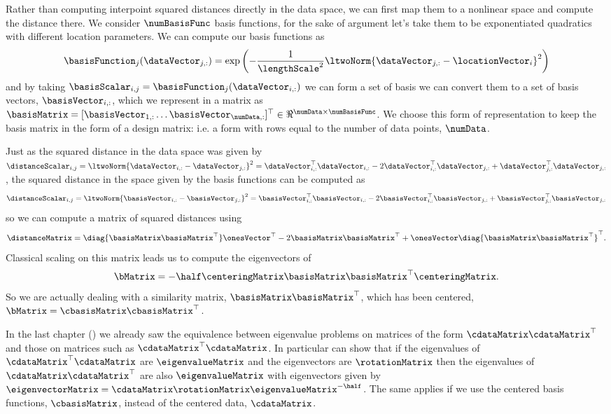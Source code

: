 Rather than computing interpoint squared distances directly in the
data space, we can first map them to a nonlinear space and compute the
distance there. We consider $\numBasisFunc$ basis functions, for the
sake of argument let's take them to be exponentiated quadratics with
different location parameters. We can compute our basis functions as
\[
\basisFunction_j(\dataVector_{j, :}) =
\exp\left(-\frac{1}{\lengthScale^2}\ltwoNorm{\dataVector_{j, :} -
    \locationVector_{i}}^2\right)
\]
and by taking $\basisScalar_{i,j}=\basisFunction_{j}(\dataVector_{i,
  :})$ we can form a set of basis we can convert them to a set of
basis vectors, $\basisVector_{i,:}$, which we represent in a matrix as
$\basisMatrix=[\basisVector_{1, :} \dots \basisVector_{\numData,
  :}]^\top\in\Re^{\numData\times \numBasisFunc}$. We choose this form
of representation to keep the basis matrix in the form of a design
matrix: i.e. a form with rows equal to the number of data points,
$\numData$.

Just as the squared distance in the data space was given by
$\distanceScalar_{i, j}=\ltwoNorm{\dataVector_{i, :} - \dataVector_{j,
    :}}^2 = \dataVector_{i, :}^\top\dataVector_{i, :} -
2\dataVector_{i, :}^\top\dataVector_{j, :} + \dataVector_{j, :}^\top
\dataVector_{j, :}$, the squared distance in the space given by the
basis functions can be computed as
\[
\distanceScalar_{i, j}=\ltwoNorm{\basisVector_{i, :} -
  \basisVector_{j, :}}^2 = \basisVector_{i, :}^\top\basisVector_{i, :}
- 2\basisVector_{i, :}^\top\basisVector_{j, :} + \basisVector_{j,
  :}^\top \basisVector_{j, :}
\]
so we can compute a matrix of squared distances using
\[
\distanceMatrix = \diag{\basisMatrix\basisMatrix^\top}
\onesVector^\top - 2\basisMatrix\basisMatrix^\top +
\onesVector\diag{\basisMatrix\basisMatrix^\top}^\top.
\]
Classical scaling on this matrix leads us to compute the eigenvectors of 
\[
\bMatrix = -\half\centeringMatrix \basisMatrix\basisMatrix^\top \centeringMatrix.
\]
So we are actually dealing with a similarity matrix,
$\basisMatrix\basisMatrix^\top$, which has been centered, $\bMatrix = \cbasisMatrix\cbasisMatrix^\top$.

In the last chapter () we already
saw the equivalence between eigenvalue problems on matrices of the
form $\cdataMatrix\cdataMatrix^\top$ and those on matrices such as
$\cdataMatrix^\top\cdataMatrix$. In particular can show that if the
eigenvalues of $\cdataMatrix^\top\cdataMatrix$ are $\eigenvalueMatrix$
and the eigenvectors are $\rotationMatrix$ then the eigenvalues of
$\cdataMatrix\cdataMatrix^\top$ are also $\eigenvalueMatrix$ with
eigenvectors given by
$\eigenvectorMatrix=\cdataMatrix\rotationMatrix\eigenvalueMatrix^{-\half}$. The
same applies if we use the centered basis functions, $\cbasisMatrix$,
instead of the centered data, $\cdataMatrix$.

